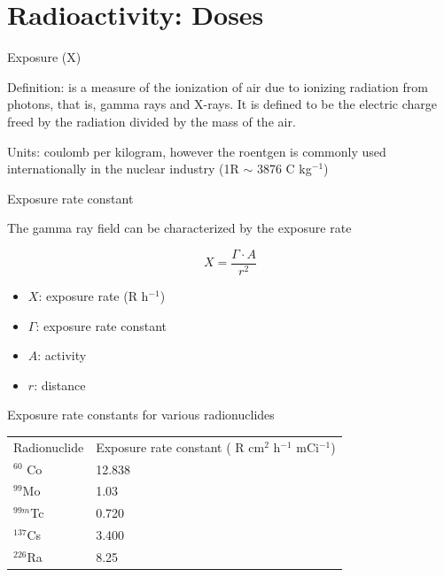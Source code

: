 \section{Radioactivity: Doses}


\begin{frame}{Exposure (X)}

\alert{Definition}:  is a measure of the ionization of air due to ionizing radiation from photons, that is, gamma rays and X-rays.  It is defined to be the electric charge freed by the radiation divided by the mass of the air.

\alert{Units}: coulomb per kilogram, however the roentgen is commonly used internationally in the nuclear industry (1R $\sim$ 3876 C kg$^{-1}$)

\end{frame}

\begin{frame}{Exposure rate constant}

\alert{The gamma ray field can be characterized by the exposure rate}



\[X=\frac{\Gamma\cdot A}{r^2}\]




\begin{itemize}
\item $X$: exposure rate (R h$^{-1}$)
\item $\Gamma$: exposure rate constant
\item $A$: activity 
\item $r$: distance 
\end{itemize}


\end{frame}



\begin{frame}{Exposure rate constants for various radionuclides}

\begin{table}[H]
\vskip -0.5cm
\begin{center}
  \begin{tabular}{p{3cm}p{3.8cm}}
  \toprule
  Radionuclide & Exposure rate constant (	R cm$^2$ h$^{-1}$ mCi$^{-1}$)  \\ \otoprule
$^{60}$ Co & 12.838 \\
$^{99}$Mo & 1.03\\
$^{99m}$Tc & 0.720\\
$^{137}$Cs & 3.400\\
$^{226}$Ra & 8.25
  \\ \bottomrule
\end{tabular}
\end{center}
\end{table}

\end{frame}

